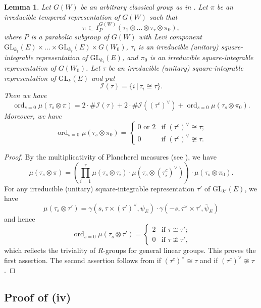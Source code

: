 \documentclass[11pt]{amsart}
\numberwithin{equation}{section}
\theoremstyle{plain}
\newtheorem{lem}[thm]{Lemma}
\theoremstyle{definition}
\theoremstyle{remark}
\DeclareMathOperator*{\ord}{ord}
\def\GL{\mathrm{GL}}
\begin{document}
\begin{lem}
\label{lem:plancherel}
Let $G(W)$ be an arbitrary classical group as in \cite[\S 2]{gi}.
Let $\pi$ be an irreducible tempered representation of $G(W)$ such that
\[
 \pi \subset I^{G(W)}_P(\tau_1 \otimes \dots \otimes \tau_r \otimes \pi_0),
\]
where $P$ is a parabolic subgroup of $G(W)$ with Levi component $\GL_{k_1}(E) \times \dots \times \GL_{k_r}(E) \times G(W_0)$, $\tau_i$ is an irreducible (unitary) square-integrable representation of $\GL_{k_i}(E)$, and $\pi_0$ is an irreducible square-integrable representation of $G(W_0)$.
Let $\tau$ be an irreducible (unitary) square-integrable representation of $\GL_k(E)$ and put
\[
 \mathcal{I}(\tau) = \{ i \, | \, \tau_i \cong \tau \}.
\]
Then we have
\[
 \ord_{s=0} \mu(\tau_s \otimes \pi) = 2 \cdot \# \mathcal{I}(\tau) + 2 \cdot \# \mathcal{I}((\tau^c)^\vee) + \ord_{s=0} \mu(\tau_s \otimes \pi_0).
\]
Moreover, we have
\[
 \ord_{s=0} \mu(\tau_s \otimes \pi_0) = 
 \begin{cases}
  \text{$0$ or $2$} & \text{if $(\tau^c)^\vee \cong \tau$;} \\
  0 & \text{if $(\tau^c)^\vee \ncong \tau$.} 
 \end{cases}
\]
\end{lem}

\begin{proof}
By the multiplicativity of Plancherel measures (see \cite[\S B.5]{gi}), we have
\[
 \mu(\tau_s \otimes \pi)
 = \left( \prod_{i=1}^r \mu(\tau_s \otimes \tau_i) \cdot \mu(\tau_s \otimes (\tau_i^c)^\vee) \right)
 \cdot \mu(\tau_s \otimes \pi_0).
\]
For any irreducible (unitary) square-integrable representation $\tau'$ of $\GL_{k'}(E)$, we have
\[
 \mu(\tau_s \otimes \tau') = \gamma(s, \tau \times (\tau')^\vee, \psi_E) \cdot \gamma(-s, \tau^\vee \times \tau', \bar{\psi}_E)
\]
and hence
\[
 \ord_{s=0} \mu(\tau_s \otimes \tau') = 
 \begin{cases}
  2 & \text{if $\tau \cong \tau'$;} \\
  0 & \text{if $\tau \ncong \tau'$,}
 \end{cases}
\]
which reflects the triviality of $R$-groups for general linear groups.
This proves the first assertion.
The second assertion follows from \cite[Corollaire IV.1.2]{w0} if $(\tau^c)^\vee \cong \tau$ and \cite[Proposition IV.2.2]{w0} if $(\tau^c)^\vee \ncong \tau$.
\end{proof}

\subsection{Proof of (iv)}
\end{document}
